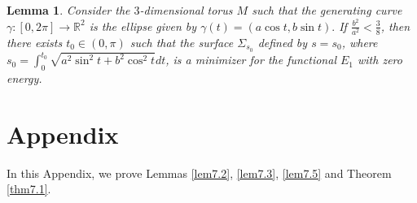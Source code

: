 \documentclass{amsart}
\newtheorem{lem}[theorem]{Lemma}
\theoremstyle{Corollary}
\numberwithin{equation}{section}
\begin{document}
\begin{lem}\label{lem6.2}
Consider the $3$-dimensional torus $M$ such that 
the generating curve  $\gamma: [0,2\pi]\to\mathbb{R}^2$
is the ellipse given by 
$\gamma(t)=(a\cos t, b\sin t).$
If $\frac{b^2}{a^2}<\frac{3}{8}$, then 
there exists $t_0\in (0,\pi)$ such that 
the surface $\Sigma_{s_0}$ defined by $s=s_0$, where $s_0=\int^{t_0}_0\sqrt{a^2\sin^2t+b^2\cos^2t}dt$, 
is a minimizer for the functional $E_1$ with zero energy.
\end{lem}
 
 
 
 
 
 
 
 
 










\section{Appendix}

In this Appendix, we prove Lemmas \ref{lem7.2}, \ref{lem7.3},
\ref{lem7.5} and Theorem \ref{thm7.1}. 
\end{document}
